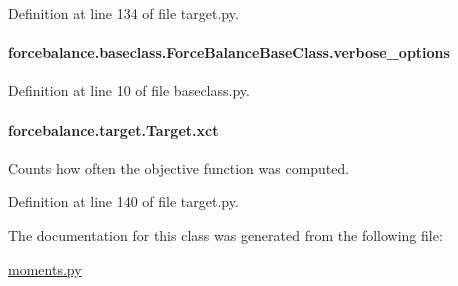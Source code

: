 Definition at line 134 of file target.\-py.

\hypertarget{classforcebalance_1_1baseclass_1_1ForceBalanceBaseClass_a8088e1e20cbd6bc175fb9c9fe9fa0f18}{
\paragraph[{verbose\-\_\-options}]{\setlength{\rightskip}{0pt plus 5cm}forcebalance.\-baseclass.\-Force\-Balance\-Base\-Class.\-verbose\-\_\-options\hspace{0.3cm}{\ttfamily [inherited]}}}\label{classforcebalance_1_1baseclass_1_1ForceBalanceBaseClass_a8088e1e20cbd6bc175fb9c9fe9fa0f18}


Definition at line 10 of file baseclass.\-py.

\hypertarget{classforcebalance_1_1target_1_1Target_aad2e385cfbf7b4a68f1c2cb41133fe82}{
\paragraph[{xct}]{\setlength{\rightskip}{0pt plus 5cm}forcebalance.\-target.\-Target.\-xct\hspace{0.3cm}{\ttfamily [inherited]}}}\label{classforcebalance_1_1target_1_1Target_aad2e385cfbf7b4a68f1c2cb41133fe82}


Counts how often the objective function was computed. 



Definition at line 140 of file target.\-py.



The documentation for this class was generated from the following file\-:\begin{DoxyCompactItemize}
\item 
\hyperlink{moments_8py}{moments.\-py}\end{DoxyCompactItemize}
